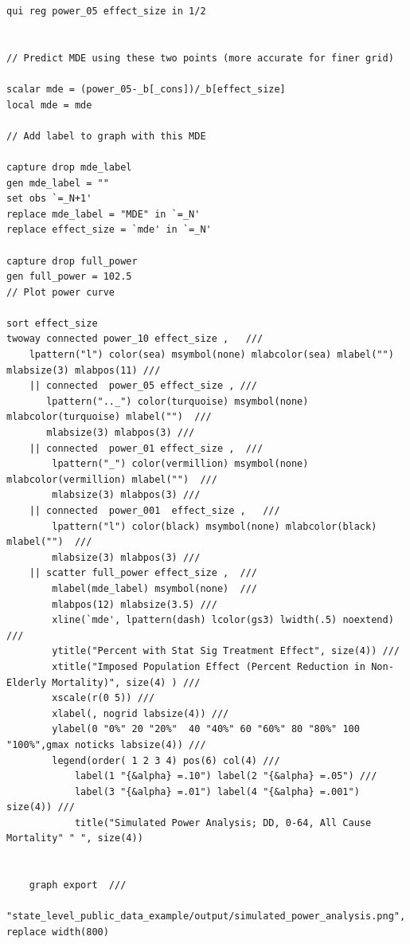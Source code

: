 \documentclass[12pt]{article}%
\begin{document}
\begin{appendices}
\begin{footnotesize}
\begin{verbatim}
qui reg power_05 effect_size in 1/2

    
// Predict MDE using these two points (more accurate for finer grid)

scalar mde = (power_05-_b[_cons])/_b[effect_size]    
local mde = mde
    
// Add label to graph with this MDE

capture drop mde_label
gen mde_label = ""
set obs `=_N+1'
replace mde_label = "MDE" in `=_N'
replace effect_size = `mde' in `=_N'

capture drop full_power
gen full_power = 102.5
// Plot power curve

sort effect_size
twoway connected power_10 effect_size ,   ///
    lpattern("l") color(sea) msymbol(none) mlabcolor(sea) mlabel("") mlabsize(3) mlabpos(11) ///
    || connected  power_05 effect_size , ///
       lpattern(".._") color(turquoise) msymbol(none) mlabcolor(turquoise) mlabel("")  /// 
       mlabsize(3) mlabpos(3) ///
    || connected  power_01 effect_size ,  /// 
        lpattern("_") color(vermillion) msymbol(none) mlabcolor(vermillion) mlabel("")  /// 
        mlabsize(3) mlabpos(3) ///
    || connected  power_001  effect_size ,   /// 
        lpattern("l") color(black) msymbol(none) mlabcolor(black) mlabel("")  ///
        mlabsize(3) mlabpos(3) ///
    || scatter full_power effect_size ,  /// 
        mlabel(mde_label) msymbol(none)  /// 
        mlabpos(12) mlabsize(3.5) ///
        xline(`mde', lpattern(dash) lcolor(gs3) lwidth(.5) noextend) ///
        ytitle("Percent with Stat Sig Treatment Effect", size(4)) ///
        xtitle("Imposed Population Effect (Percent Reduction in Non-Elderly Mortality)", size(4) ) ///
        xscale(r(0 5)) ///
        xlabel(, nogrid labsize(4)) ///
        ylabel(0 "0%" 20 "20%"  40 "40%" 60 "60%" 80 "80%" 100 "100%",gmax noticks labsize(4)) ///
        legend(order( 1 2 3 4) pos(6) col(4) ///
            label(1 "{&alpha} =.10") label(2 "{&alpha} =.05") ///
            label(3 "{&alpha} =.01") label(4 "{&alpha} =.001") size(4)) ///
            title("Simulated Power Analysis; DD, 0-64, All Cause Mortality" " ", size(4))


    graph export  ///
      "state_level_public_data_example/output/simulated_power_analysis.png",  replace width(800)

\end{verbatim}
\end{footnotesize}


\end{appendices}
\end{document}
